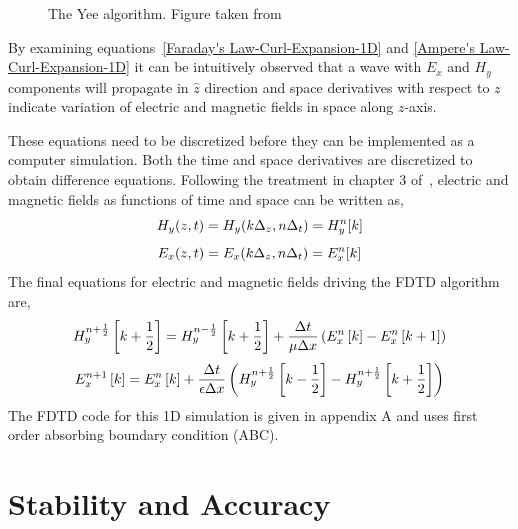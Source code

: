 \documentclass[10pt,A4paper]{report}
\begin{document}
\begin{figure}[here]
\centering
\caption{The Yee algorithm. Figure taken from~\cite{JBSchneiderUFDTD}}
\label{Algorithm}
\end{figure}

By examining equations~\ref{Faraday's Law-Curl-Expansion-1D} and \ref{Ampere's Law-Curl-Expansion-1D} it can be intuitively observed that a wave with $E_x$ and $H_y$ components will propagate in $\hat{z}$ direction and space derivatives with respect to $z$ indicate variation of electric and magnetic fields in space along $z$-axis.

These equations need to be discretized before they can be implemented as a computer simulation. Both the time and space derivatives are discretized to obtain difference equations. Following the treatment in chapter 3 of~\cite{JBSchneiderUFDTD}, electric and magnetic fields as functions of time and space can be written as,
\begin{equation}
\centering
H_y (z,t)=H_y (k\Delta _z,n\Delta _t)=H^n_y[k]
\label{Hy-of-z_and_t}
\end{equation}
\begin{equation}
\centering
E_x (z,t)=E_x (k\Delta _z,n\Delta _t)=E^n_x[k]
\label{Ex-of-z_and_t}
\end{equation}
The final equations for electric and magnetic fields driving the FDTD algorithm are,
\begin{equation}
\centering
H^{n+\frac{1}{2}}_y \left[k+\frac{1}{2}\right]=H^{n-\frac{1}{2}}_y \left[k+\frac{1}{2}\right] + \dfrac{\Delta t}{\mu \Delta x} \left( E^{n}_x \left[k\right] - E^{n}_x \left[k+1\right] \right)
\label{Hy-1D-Simple-FDTD-Driver}
\end{equation}
\begin{equation}
\centering
E^{n+1}_x \left[k\right]=E^{n}_x \left[k\right] + \dfrac{\Delta t}{\epsilon \Delta x} \left( H^{n+\frac{1}{2}}_y \left[k-\frac{1}{2}\right] - H^{n+\frac{1}{2}}_y \left[k+\frac{1}{2}\right] \right)
\label{Ex-1D-Simple-FDTD-Driver}
\end{equation}
The FDTD code for this 1D simulation is given in appendix A and uses first order absorbing boundary condition (ABC).

\section{Stability and Accuracy}
\end{document}
